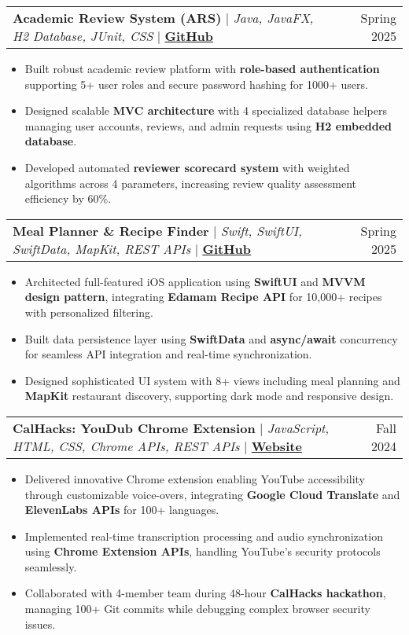 \documentclass[letterpaper,10pt]{article} %
\makeatletter
\newcommand{\resumeItem}[1]{
  \item\small{
    {#1 \vspace{-2pt}}
  }
}
\newcommand{\resumeProjectHeading}[2]{
  \item
  \begin{tabular*}{0.97\textwidth}{l@{\extracolsep{\fill}}r}
    \small#1 & #2 \\
  \end{tabular*}\vspace{-5pt}
}
\newcommand{\resumeItemListStart}{\begin{itemize}}
\newcommand{\resumeItemListEnd}{\end{itemize}\vspace{-3pt}}
\makeatother
\begin{document}
\resumeProjectHeading
  {\textbf{Academic Review System (ARS)} $|$ \emph{Java, JavaFX, H2 Database, JUnit, CSS} $|$ \href{https://github.com/A-Wattamwar/Academic_Review_System}{\textbf{GitHub}}}{Spring 2025}
\resumeItemListStart
 \resumeItem{Built robust academic review platform with \textbf{role-based authentication} supporting 5+ user roles and secure password hashing for 1000+ users.}
  \resumeItem{Designed scalable \textbf{MVC architecture} with 4 specialized database helpers managing user accounts, reviews, and admin requests using \textbf{H2 embedded database}.}
  \resumeItem{Developed automated \textbf{reviewer scorecard system} with weighted algorithms across 4 parameters, increasing review quality assessment efficiency by 60\%.}
\resumeItemListEnd
     
    \resumeProjectHeading
      {\textbf{Meal Planner \& Recipe Finder} $|$ \emph{Swift, SwiftUI, SwiftData, MapKit, REST APIs} $|$ \href{https://github.com/A-Wattamwar/Meal_Planner_Recipe_Finder}{\textbf{GitHub}}}{Spring 2025}
    \resumeItemListStart
      \resumeItem{Architected full-featured iOS application using \textbf{SwiftUI} and \textbf{MVVM design pattern}, integrating \textbf{Edamam Recipe API} for 10,000+ recipes with personalized filtering.}
      \resumeItem{Built data persistence layer using \textbf{SwiftData} and \textbf{async/await} concurrency for seamless API integration and real-time synchronization.}
      \resumeItem{Designed sophisticated UI system with 8+ views including meal planning and \textbf{MapKit} restaurant discovery, supporting dark mode and responsive design.}
    \resumeItemListEnd

    \resumeProjectHeading
      {\textbf{CalHacks: YouDub Chrome Extension} $|$ \emph{JavaScript, HTML, CSS, Chrome APIs, REST APIs} $|$ \href{https://devpost.com/software/youdub}{\textbf{Website}}}{Fall 2024}
    \resumeItemListStart
      \resumeItem{Delivered innovative Chrome extension enabling YouTube accessibility through customizable voice-overs, integrating \textbf{Google Cloud Translate} and \textbf{ElevenLabs APIs} for 100+ languages.}
      \resumeItem{Implemented real-time transcription processing and audio synchronization using \textbf{Chrome Extension APIs}, handling YouTube's security protocols seamlessly.}
      \resumeItem{Collaborated with 4-member team during 48-hour \textbf{CalHacks hackathon}, managing 100+ Git commits while debugging complex browser security issues.}
    \resumeItemListEnd
\end{document}
